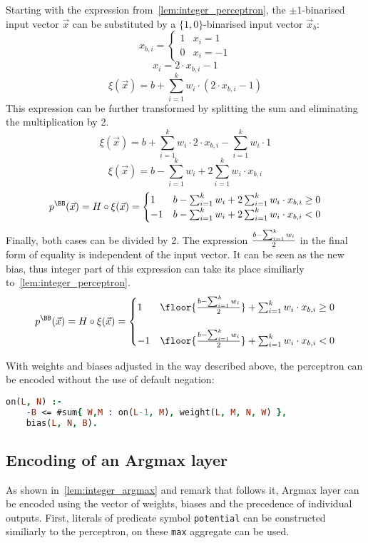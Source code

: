 Starting with the expression from~\ref{lem:integer_perceptron}, the $\pm 1$-binarised
input vector $\vec x$ can be substituted by a $\{1,0\}$-binarised input vector
$\vec x_b$:
\[x_{b,i} = \begin{cases}
    1 & x_i = 1\\
    0 & x_i = -1
\end{cases}\]
\[x_i = 2\cdot x_{b,i} - 1\]
\[\xi(\vec x) = b + \sum_{i=1}^k w_i\cdot (2\cdot x_{b,i} - 1)\]
This expression can be further transformed by splitting the sum and eliminating
the multiplication by 2.
\[\xi(\vec x) = b + \sum_{i=1}^k w_i\cdot 2 \cdot x_{b,i} - \sum_{i=1}^k w_i\cdot 1\]
\[\xi(\vec x) = b - \sum_{i=1}^k w_i + 2\sum_{i=1}^k w_i \cdot x_{b,i}\]
\[p^\BB(\vec x) = H \circ \xi (\vec x) = \begin{cases}
    1 & b - \sum_{i=1}^k w_i + 2\sum_{i=1}^k w_i \cdot x_{b,i} \geq 0\\
    -1 & b - \sum_{i=1}^k w_i + 2\sum_{i=1}^k w_i \cdot x_{b,i} < 0
\end{cases}\]
Finally, both cases can be divided by 2. The expression $b-\sum_{i=1}^k w_i\over 2$
in the final form of equality is independent of the input vector.
It can be seen as the new bias, thus integer part of this expression can take its
place similiarly to~\cref{lem:integer_perceptron}.
\[p^\BB(\vec x) = H \circ \xi (\vec x) = \begin{cases}
    1 & \floor{{b - \sum_{i=1}^k w_i \over 2}} + \sum_{i=1}^k w_i \cdot x_{b,i} \geq 0\\
    {} & {}\\
    -1 & \floor{{b - \sum_{i=1}^k w_i \over 2}} + \sum_{i=1}^k w_i \cdot x_{b,i} < 0
\end{cases}\]

With weights and biases adjusted in the way described above, the perceptron can be
encoded without the use of default negation:

\begin{lstlisting}[language=Prolog, numbers=none]
on(L, N) :-
    -B <= #sum{ W,M : on(L-1, M), weight(L, M, N, W) },
    bias(L, N, B).
\end{lstlisting}

\subsection{Encoding of an Argmax layer}

As shown in~\cref{lem:integer_argmax} and remark that follows it, Argmax layer can
be encoded using the vector of weights, biases and the precedence of individual outputs.
First, literals of predicate symbol \texttt{potential} can be constructed similiarly
to the perceptron, on these \texttt{max} aggregate can be used.

